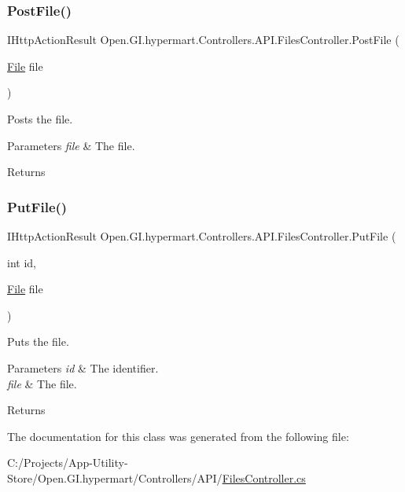 \subsubsection{\texorpdfstring{Post\+File()}{PostFile()}}
{\footnotesize\ttfamily I\+Http\+Action\+Result Open.\+G\+I.\+hypermart.\+Controllers.\+A\+P\+I.\+Files\+Controller.\+Post\+File (\begin{DoxyParamCaption}\item[{\hyperlink{class_open_1_1_g_i_1_1hypermart_1_1_models_1_1_file}{File}}]{file }\end{DoxyParamCaption})}



Posts the file. 


\begin{DoxyParams}{Parameters}
{\em file} & The file.\\
\hline
\end{DoxyParams}
\begin{DoxyReturn}{Returns}

\end{DoxyReturn}
\hypertarget{class_open_1_1_g_i_1_1hypermart_1_1_controllers_1_1_a_p_i_1_1_files_controller_a773d8f70de8b006795b74c1bd921bdb2}{}\label{class_open_1_1_g_i_1_1hypermart_1_1_controllers_1_1_a_p_i_1_1_files_controller_a773d8f70de8b006795b74c1bd921bdb2} 
\subsubsection{\texorpdfstring{Put\+File()}{PutFile()}}
{\footnotesize\ttfamily I\+Http\+Action\+Result Open.\+G\+I.\+hypermart.\+Controllers.\+A\+P\+I.\+Files\+Controller.\+Put\+File (\begin{DoxyParamCaption}\item[{int}]{id,  }\item[{\hyperlink{class_open_1_1_g_i_1_1hypermart_1_1_models_1_1_file}{File}}]{file }\end{DoxyParamCaption})}



Puts the file. 


\begin{DoxyParams}{Parameters}
{\em id} & The identifier.\\
\hline
{\em file} & The file.\\
\hline
\end{DoxyParams}
\begin{DoxyReturn}{Returns}

\end{DoxyReturn}


The documentation for this class was generated from the following file\+:\begin{DoxyCompactItemize}
\item 
C\+:/\+Projects/\+App-\/\+Utility-\/\+Store/\+Open.\+G\+I.\+hypermart/\+Controllers/\+A\+P\+I/\hyperlink{_files_controller_8cs}{Files\+Controller.\+cs}\end{DoxyCompactItemize}
